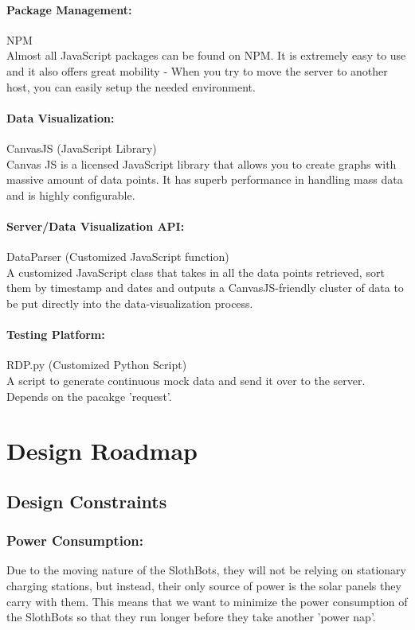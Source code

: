 \documentclass{article}
\begin{document}
\paragraph{Package Management:} NPM\\
Almost all JavaScript packages can be found on NPM. It is extremely easy to use and it also offers great mobility - When 
you try to move the server to another host, you can easily setup the needed environment.
\paragraph{Data Visualization:} CanvasJS (JavaScript Library)\\
Canvas JS is a licensed JavaScript library that allows you to create graphs with massive amount of data points. It has superb performance in 
handling mass data and is highly configurable.
\paragraph{Server/Data Visualization API: } DataParser (Customized JavaScript function)\\
A customized JavaScript class that takes in all the data points retrieved, sort them by timestamp and dates and outputs a CanvasJS-friendly
cluster of data to be put directly into the data-visualization process.
\paragraph{Testing Platform: } RDP.py (Customized Python Script)\\
A script to generate continuous mock data and send it over to the server. Depends on the pacakge 'request'.

\newpage
\section{Design Roadmap}
\subsection{Design Constraints}
\subsubsection{Power Consumption: } Due to the moving nature of the SlothBots, they will not be relying on stationary charging stations, but instead, their only source of power is 
the solar panels they carry with them. This means that we want to minimize the power consumption of the SlothBots so that they run longer before they take another 'power nap'.
\end{document}
